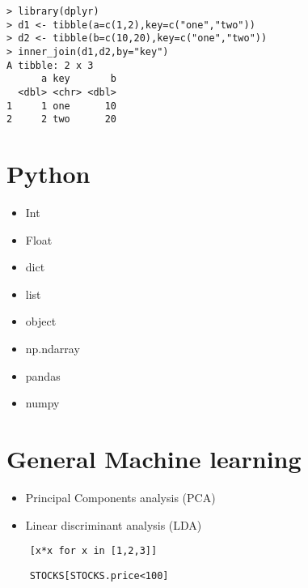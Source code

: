 \documentclass{article}
\begin{document}
\begin{lstlisting}
> library(dplyr)
> d1 <- tibble(a=c(1,2),key=c("one","two"))
> d2 <- tibble(b=c(10,20),key=c("one","two"))
> inner_join(d1,d2,by="key")
A tibble: 2 x 3
      a key       b
  <dbl> <chr> <dbl>
1     1 one      10
2     2 two      20
\end{lstlisting}

\section{Python}
\begin{itemize}
    \item Int
    \item Float
    \item dict
    \item list
    \item object
    \item np.ndarray
\end{itemize}

\begin{itemize}
    \item{pandas}
    \item{numpy}
\end{itemize}

\section{General Machine learning}
\begin{itemize}
    \item Principal Components analysis (PCA)
    \item Linear discriminant analysis (LDA)
\end{itemize}

\begin{lstlisting}
    [x*x for x in [1,2,3]]
\end{lstlisting}

\begin{lstlisting}
    STOCKS[STOCKS.price<100]
\end{lstlisting}
\end{document}
